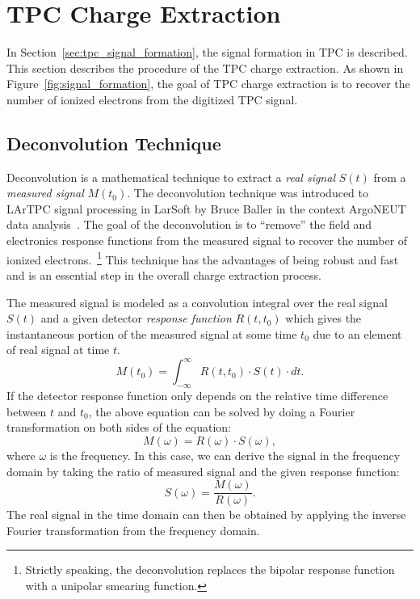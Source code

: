 \section{TPC Charge Extraction}
\label{sec:tpc-signal-calibration}

In Section~\ref{sec:tpc_signal_formation}, the signal formation in TPC
is described. This section describes the procedure of the TPC 
charge extraction. As shown in Figure~\ref{fig:signal_formation}, the 
goal of TPC charge extraction is to recover the number of ionized 
electrons from the digitized TPC signal. 

\subsection{Deconvolution Technique}\label{sec:decon}
\label{sec:decon-tech}
Deconvolution is a mathematical technique to extract a \textit{real signal}
$S(t)$ from a \textit{measured signal} $M(t_0)$. The deconvolution technique 
was introduced to LArTPC signal processing in LarSoft by Bruce Baller in the 
context ArgoNEUT data analysis~\cite{bruce}. 
The goal of the deconvolution is 
to ``remove'' the field and electronics response functions from the measured 
signal to recover the number of ionized electrons.~\footnote{Strictly speaking,
the deconvolution replaces the bipolar response function with a unipolar smearing
function.} This technique has the advantages of being robust and fast and is an 
essential step in the overall charge extraction process. 

The measured signal is modeled as a convolution integral over the real 
signal $S(t)$ and a given detector \textit{response function} $R(t,t_0)$ which gives the
instantaneous portion of the measured signal at some time $t_0$ due to
an element of real signal at time $t$.
\begin{equation}\label{eq:decon_1}
M(t_0) = \int_{-\infty}^{\infty}  R(t,t_0) \cdot S(t) \cdot dt.
\end{equation}
If the detector response function only depends on the relative time 
difference between $t$ and $t_0$, the above equation can be solved by 
doing a Fourier transformation on both sides of the equation:
\begin{equation}
M(\omega) = R(\omega) \cdot S(\omega), 
\end{equation}
where $\omega$ is the frequency. In this case, we can derive the signal in the 
frequency domain by taking the ratio of measured signal and the given
response function:
\begin{equation}\label{eq:decon_2}
S(\omega) = \frac{M(\omega)}{R(\omega)}.
\end{equation}
The real signal in the time domain can then be obtained by applying the 
inverse Fourier transformation from the frequency domain. 

